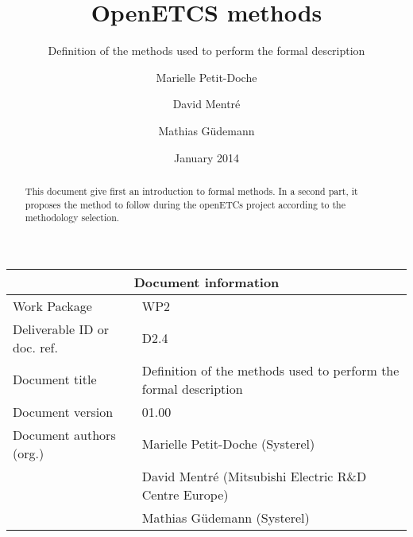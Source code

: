 \documentclass{template/openetcs_article}
\begin{document}
\frontmatter
{}






\title{OpenETCS methods}

\subtitle{ Definition of the methods used to perform the formal description}

\date{January 2014}


\author{Marielle Petit-Doche}


\author{David Mentré}

\author{Mathias Güdemann}


 


\begin{abstract}
This document give first an introduction to formal  methods.
In a second part, it proposes the method to  follow during the openETCs project according to the methodology selection.

\end{abstract}

\maketitle
\tableofcontents
\listoffiguresandtables
\newpage

\begin{tabular}{|p{4.4cm}|p{8.7cm}|}
\hline
\multicolumn{2}{|c|}{Document information} \\
\hline
Work Package &  WP2  \\
Deliverable ID or doc. ref. & D2.4\\
\hline
Document title & Definition of the methods used to perform the formal description \\
Document version & 01.00 \\
Document authors (org.)  & Marielle Petit-Doche (Systerel)  \\
  & David Mentré (Mitsubishi Electric R\&D Centre Europe)  \\
  & Mathias Güdemann (Systerel)  \\
\hline
\end{tabular}
\end{document}
